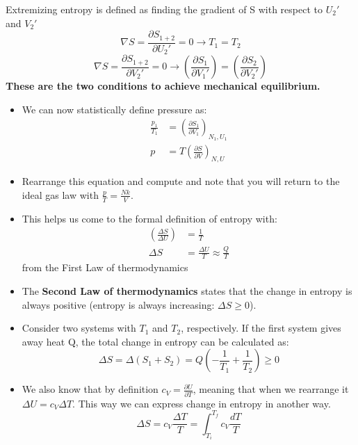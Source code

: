 \documentclass[12pt, letterpaper, twoside]{article}
\begin{document}
\begin{tcolorbox}[enhanced, boxrule = 0pt, frame hidden]
    Extremizing entropy is defined as finding the gradient of S with respect to $U_2'$ and $V_2'$
    \begin{equation}
        \nabla S = \frac{\partial S_{1+2}}{\partial U_2'} = 0 \rightarrow T_1 = T_2
    \end{equation}
    \begin{equation}
        \nabla S = \frac{\partial S_{1+2}}{\partial V_2'} = 0 \rightarrow (\frac{\partial S_1}{\partial V_1'}) = (\frac{\partial S_2}{\partial V_2'})
    \end{equation}
    \textbf{These are the two conditions to achieve mechanical equilibrium.}
\end{tcolorbox}
\begin{itemize}
    \item We can now statistically define pressure as:
    \begin{align}
        \frac{p_1}{T_1} &= (\frac{\partial S_1}{\partial V_1})_{N_1,U_1}\\
        p &= T(\frac{\partial S}{\partial V})_{N,U}
    \end{align}
    \item Rearrange this equation and compute and note that you will return to the ideal gas law with $\frac{p}{T} = \frac{Nk}{V}$.
    \item This helps us come to the formal definition of entropy with:
    \begin{align*}
        (\frac{\Delta S}{\Delta U}) &= \frac{1}{T} \\
        \Delta S &= \frac{\Delta U}{T} \approx \frac{Q}{T}
    \end{align*}
    from the First Law of thermodynamics
    \item The \textbf{Second Law of thermodynamics} states that the change in entropy is always positive (entropy is always increasing: $\Delta S \geq 0$).
    \item Consider two systems with $T_1$ and $T_2$, respectively. If the first system gives away heat Q, the total change in entropy can be calculated as:
    \begin{equation*}
        \Delta S = \Delta (S_1 + S_2) = Q(-\frac{1}{T_1}+\frac{1}{T_2}) \geq 0
    \end{equation*}
    \item We also know that by definition $c_V = \frac{\partial U}{\partial T}$, meaning that when we rearrange it $\Delta U = c_V\Delta T$. This way we can express change in entropy in another way.
    \begin{equation*}
        \Delta S = c_V\frac{\Delta T}{T} = \int_{T_i}^{T_f}c_V\frac{dT}{T}
    \end{equation*}
\end{itemize}
\end{document}
